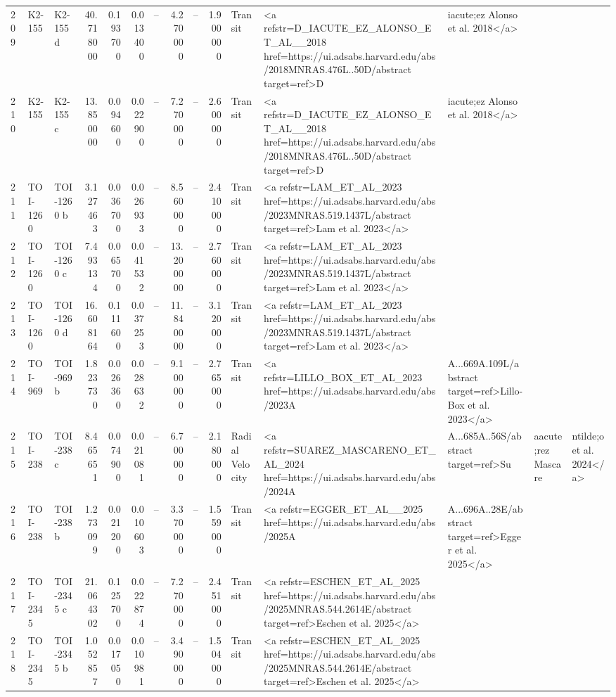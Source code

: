 \begin{tabular}{lllrrrrrrrll}
209 & K2-155 & K2-155 d & 40.718000 & 0.193700 & 0.013400 & -- & 4.270000 & -- & 1.900000 & Transit & <a refstr=D_IACUTE_EZ_ALONSO_ET_AL__2018 href=https://ui.adsabs.harvard.edu/abs/2018MNRAS.476L..50D/abstract target=ref>D&iacute;ez Alonso et al. 2018</a> \\
210 & K2-155 & K2-155 c & 13.850000 & 0.094600 & 0.022900 & -- & 7.270000 & -- & 2.600000 & Transit & <a refstr=D_IACUTE_EZ_ALONSO_ET_AL__2018 href=https://ui.adsabs.harvard.edu/abs/2018MNRAS.476L..50D/abstract target=ref>D&iacute;ez Alonso et al. 2018</a> \\
211 & TOI-1260 & TOI-1260 b & 3.127463 & 0.036700 & 0.026933 & -- & 8.560000 & -- & 2.410000 & Transit & <a refstr=LAM_ET_AL_2023 href=https://ui.adsabs.harvard.edu/abs/2023MNRAS.519.1437L/abstract target=ref>Lam et al. 2023</a> \\
212 & TOI-1260 & TOI-1260 c & 7.493134 & 0.065700 & 0.041532 & -- & 13.200000 & -- & 2.760000 & Transit & <a refstr=LAM_ET_AL_2023 href=https://ui.adsabs.harvard.edu/abs/2023MNRAS.519.1437L/abstract target=ref>Lam et al. 2023</a> \\
213 & TOI-1260 & TOI-1260 d & 16.608164 & 0.111600 & 0.037253 & -- & 11.840000 & -- & 3.120000 & Transit & <a refstr=LAM_ET_AL_2023 href=https://ui.adsabs.harvard.edu/abs/2023MNRAS.519.1437L/abstract target=ref>Lam et al. 2023</a> \\
214 & TOI-969 & TOI-969 b & 1.823730 & 0.026360 & 0.028632 & -- & 9.100000 & -- & 2.765000 & Transit & <a refstr=LILLO_BOX_ET_AL_2023 href=https://ui.adsabs.harvard.edu/abs/2023A&A...669A.109L/abstract target=ref>Lillo-Box et al. 2023</a> \\
215 & TOI-238 & TOI-238 c & 8.465651 & 0.074900 & 0.021081 & -- & 6.700000 & -- & 2.180000 & Radial Velocity & <a refstr=SUAREZ_MASCARENO_ET_AL_2024 href=https://ui.adsabs.harvard.edu/abs/2024A&A...685A..56S/abstract target=ref>Su&aacute;rez Mascare&ntilde;o et al. 2024</a> \\
216 & TOI-238 & TOI-238 b & 1.273099 & 0.021200 & 0.010603 & -- & 3.370000 & -- & 1.559000 & Transit & <a refstr=EGGER_ET_AL__2025 href=https://ui.adsabs.harvard.edu/abs/2025A&A...696A..28E/abstract target=ref>Egger et al. 2025</a> \\
217 & TOI-2345 & TOI-2345 c & 21.064302 & 0.125700 & 0.022874 & -- & 7.270000 & -- & 2.451000 & Transit & <a refstr=ESCHEN_ET_AL_2025 href=https://ui.adsabs.harvard.edu/abs/2025MNRAS.544.2614E/abstract target=ref>Eschen et al. 2025</a> \\
218 & TOI-2345 & TOI-2345 b & 1.052857 & 0.017050 & 0.010981 & -- & 3.490000 & -- & 1.504000 & Transit & <a refstr=ESCHEN_ET_AL_2025 href=https://ui.adsabs.harvard.edu/abs/2025MNRAS.544.2614E/abstract target=ref>Eschen et al. 2025</a> \\

\end{tabular}
